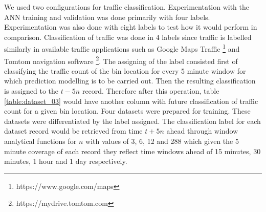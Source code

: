 \documentclass[12pt, a4paper]{report}
\theoremstyle{definition}
\theoremstyle{definition}%
\theoremstyle{definition}%
\theoremstyle{definition}%
\theoremstyle{definition}%
\theoremstyle{definition}%
\begin{document}
We used two configurations for traffic classification. Experimentation with the ANN training and validation was done primarily with four labels. Experimentation was also done with eight labels to test how it would perform in comparison. Classification of traffic was done in 4 labels since traffic is labelled similarly in available traffic applications such as Google Maps Traffic \footnote{https://www.google.com/maps} and Tomtom navigation software \footnote{https://mydrive.tomtom.com}. The assigning of the label consisted first of classifying the traffic count of the bin location for every 5 minute window for which prediction modelling is to be carried out.  Then the resulting classification is assigned to the $t - 5n$ record. Therefore after this operation, table \ref{table:dataset_03} would have another column with future classification of traffic count for a given bin location. Four datasets were prepared for training. These datasets were differentiated by the label assigned. The classification label for each dataset record would be retrieved from time $t+5n$ ahead through window analytical functions for $n$ with values of 3, 6, 12 and 288 which given the 5 minute coverage of each record they reflect time windows ahead of 15 minutes, 30 minutes, 1 hour and 1 day respectively.


\begin{table}[h]	
	\centering
\caption{A sample of traffic flow count by bin for every 5 minute window.} 
\label{table:dataset_02}
\end{table}
\end{document}
